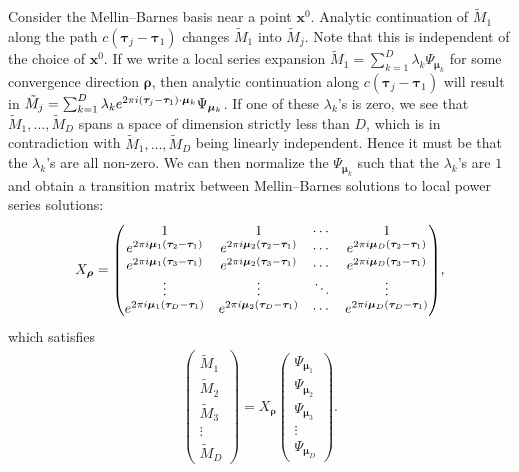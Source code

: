 \documentclass[11pt]{article}
\numberwithin{equation}{section}
\numberwithin{equation}{section}
\begin{document}
Consider the Mellin--Barnes basis near a point $\bm{x}^0$. Analytic continuation
of $\tilde{M}_1$ along the path $c(\bm\tau_j-\bm\tau_1)$ changes $\tilde{M}_1$ into $\tilde{M}_j$. Note that this
is independent of the choice of $\bm{x}^0$.
If we write a local series expansion
$\tilde{M}_1 = \sum_{k=1}^{D} \lambda_k \Psi_{\bm\mu_k}$ for some
convergence direction $\bm\rho$, then analytic continuation along
$c(\bm\tau_j-\bm\tau_1)$ will result in
$\tilde{M}_j = \sum_{k=1}^{D} \lambda_k {\rm e}^{2\pi {\rm i}(\bm\tau_j-\bm\tau_1)\cdot \bm\mu_k}
\Psi_{\bm\mu_k}$.
If one of these $\lambda_k$'s is zero, we see that $\tilde{M}_1,\dots,\tilde{M}_D$ spans a space of dimension strictly less than $D$, which is in contradiction with $\tilde{M}_1,\dots,\tilde{M}_D$ being linearly independent. Hence it must be that the $\lambda_k$'s are all non-zero. We can then normalize the $\Psi_{\bm\mu_k}$ such that the $\lambda_k$'s are $1$ and obtain a transition matrix between Mellin--Barnes solutions to local power series solutions:
\begin{gather}X_{\bm\rho} = \begin{pmatrix}
 1 & 1 & \cdots & 1 \\
 {\rm e}^{2\pi {\rm i} \bm\mu_1(\bm\tau_{2} - \bm\tau_{1})} & {\rm e}^{2\pi {\rm i} \bm\mu_2(\bm\tau_{2} - \bm\tau_{1})} & \cdots & {\rm e}^{2\pi {\rm i} \bm\mu_D(\bm\tau_{2} - \bm\tau_{1})} \\
 {\rm e}^{2\pi {\rm i} \bm\mu_1(\bm\tau_{3} - \bm\tau_{1})} & {\rm e}^{2\pi {\rm i} \bm\mu_2(\bm\tau_{3} - \bm\tau_{1}) } & \cdots & {\rm e}^{2\pi {\rm i} \bm\mu_D(\bm\tau_{3} - \bm\tau_{1})} \\
 \vdots & \vdots & \ddots & \vdots \\
 {\rm e}^{2\pi {\rm i} \bm\mu_1(\bm\tau_{D} - \bm\tau_{1})} & {\rm e}^{2\pi {\rm i} \bm\mu_2(\bm\tau_{D} - \bm\tau_{1})} & \cdots & {\rm e}^{2\pi {\rm i} \bm\mu_D(\bm\tau_{D} - \bm\tau_{1})}
 \end{pmatrix}\!,\label{eq-Xrho}\end{gather}
which satisfies
\begin{gather*}
\begin{pmatrix}
\tilde{M}_1\\ \tilde{M}_2\\ \tilde{M}_3\\ \vdots \\ \tilde{M}_D\end{pmatrix} = X_{\bm\rho} \begin{pmatrix}\Psi_{\bm\mu_1} \\ \Psi_{\bm\mu_2} \\ \Psi_{\bm\mu_3} \\ \vdots \\ \Psi_{\bm\mu_D}
\end{pmatrix}\!.
\end{gather*}
\end{document}
